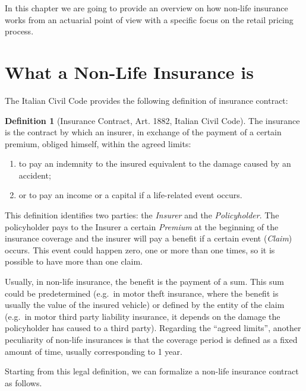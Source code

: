 \documentclass[a4paper, nobind]{templates/ociamthesis}
\theoremstyle{definition}
\newtheorem{definition}{Definition}[chapter]
\theoremstyle{definition}
\theoremstyle{definition}
\theoremstyle{remark}
\begin{document}
In this chapter we are going to provide an overview on how non-life insurance works from an actuarial point of view with a specific focus on the retail pricing process.

\hypertarget{chap:non-life-ins}{%
\section{What a Non-Life Insurance is}\label{chap:non-life-ins}}

The Italian Civil Code provides the following definition of insurance contract:

\begin{definition}[Insurance Contract, Art. 1882, Italian Civil Code]
\label{def:ins-contr} \iffalse (Insurance Contract, Art. 1882, Italian Civil Code) \fi{} The insurance is the contract by which an insurer, in exchange of the payment of a certain premium, obliged himself, within the agreed limits:

\begin{enumerate}[noitemsep]
  \item to pay an indemnity to the insured equivalent to the damage caused by an accident;
  \item or to pay an income or a capital if a life-related event occurs.
\end{enumerate}
\end{definition}

This definition identifies two parties: the \emph{Insurer} and the \emph{Policyholder}. The policyholder pays to the Insurer a certain \emph{Premium} at the beginning of the insurance coverage and the insurer will pay a benefit if a certain event (\emph{Claim}) occurs. This event could happen zero, one or more than one times, so it is possible to have more than one claim.

Usually, in non-life insurance, the benefit is the payment of a sum. This sum could be predetermined (e.g.~in motor theft insurance, where the benefit is usually the value of the insured vehicle) or defined by the entity of the claim (e.g.~in motor third party liability insurance, it depends on the damage the policyholder has caused to a third party). Regarding the ``agreed limits'', another peculiarity of non-life insurances is that the coverage period is defined as a fixed amount of time, usually corresponding to 1 year.

Starting from this legal definition, we can formalize a non-life insurance contract as follows.
\end{document}
